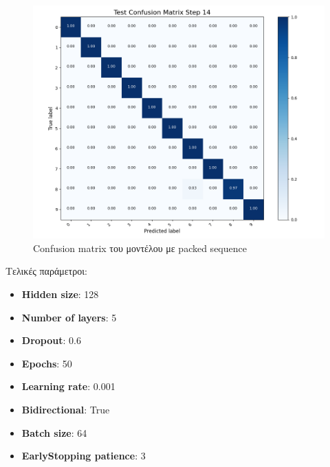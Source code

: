 \documentclass[a4paper,12pt]{article}
\begin{document}
\begin{figure}[ht]
    \centering
    \includegraphics[width=\textwidth]{confusion_matrix_lstm_packed.png}
    \caption{Confusion matrix του μοντέλου με packed sequence}
    \label{fig:confusion_matrix_lstm_packed}
\end{figure}

Τελικές παράμετροι:

\begin{itemize}
    \item \textbf{Hidden size}: 128
    \item \textbf{Number of layers}: 5
    \item \textbf{Dropout}: 0.6
    \item \textbf{Epochs}: 50
    \item \textbf{Learning rate}: 0.001
    \item \textbf{Bidirectional}: True
    \item \textbf{Batch size}: 64
    \item \textbf{EarlyStopping patience}: 3
\end{itemize}





\end{document}
